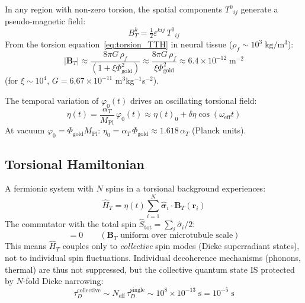 \documentclass[12pt,a4paper]{article}
\newcommand{\MPl}{M_{\mathrm{Pl}}}
\newcommand{\etacoupl}{\eta(t)}
\newcommand{\BT}{\mathbf{B}_T}
\newcommand{\HatH}{\hat{H}}
\newcommand{\alphaT}{\alpha_T}
\numberwithin{equation}{section}
\begin{document}
In any region with non-zero torsion, the spatial components $T^0{}_{ij}$
generate a pseudo-magnetic field:
\begin{equation}
  B_T^k = \tfrac{1}{2}\varepsilon^{kij}\,T^0{}_{ij}
  \label{eq:BT}
\end{equation}
From the torsion equation~\eqref{eq:torsion_TTH} in neural tissue
($\rho_f \sim 10^3\;\mathrm{kg/m^3}$):
\begin{equation}
  |\BT| \approx \frac{8\pi G\,\rho_f}{(1 + \xi\Phi_{\mathrm{gold}}^2)}
  \approx \frac{8\pi G\,\rho_f}{\xi\Phi_{\mathrm{gold}}^2}
  \approx 6.4\times10^{-12}\;\mathrm{m}^{-2}
  \label{eq:BT_magnitude}
\end{equation}
(for $\xi \sim 10^4$, $G = 6.67\times10^{-11}$ m$^3$kg$^{-1}$s$^{-2}$).

The temporal variation of $\varphi_0(t)$ drives an oscillating torsional field:
\begin{equation}
  \etacoupl = \frac{\alphaT}{\MPl}\,\varphi_0(t)
  \approx \etacoupl_0 + \delta\eta\cos(\omega_{\mathrm{eff}} t)
  \label{eq:eta}
\end{equation}
At vacuum $\varphi_0 = \Phi_{\mathrm{gold}}\MPl$:
$\eta_0 = \alphaT\,\Phi_{\mathrm{gold}} \approx 1.618\,\alphaT$ (Planck units).

\subsection{Torsional Hamiltonian}

A fermionic system with $N$ spins in a torsional background experiences:
\begin{equation}
  \HatH_T = \etacoupl\sum_{i=1}^N \hat{\boldsymbol{\sigma}}_i\cdot\BT(\mathbf{r}_i)
  \label{eq:H_torsion}
\end{equation}
The commutator with the total spin $\hat{S}_{\mathrm{tot}} = \sum_i\hat{\sigma}_i/2$:
\begin{equation}
  [\HatH_T,\,\hat{S}_{\mathrm{tot}}] = 0
  \qquad (\BT\text{ uniform over microtubule scale})
  \label{eq:commutator}
\end{equation}
This means $\HatH_T$ couples only to \emph{collective} spin modes
(Dicke superradiant states), not to individual spin fluctuations.
Individual decoherence mechanisms (phonons, thermal) are thus not suppressed,
but the collective quantum state IS protected by $N$-fold Dicke narrowing:
\begin{equation}
  \tau_D^{\mathrm{collective}} \sim N_{\mathrm{eff}}\,\tau_D^{\mathrm{single}}
  \sim 10^8 \times 10^{-13}\;\mathrm{s} = 10^{-5}\;\mathrm{s}
  \label{eq:dicke_tau}
\end{equation}
\end{document}
